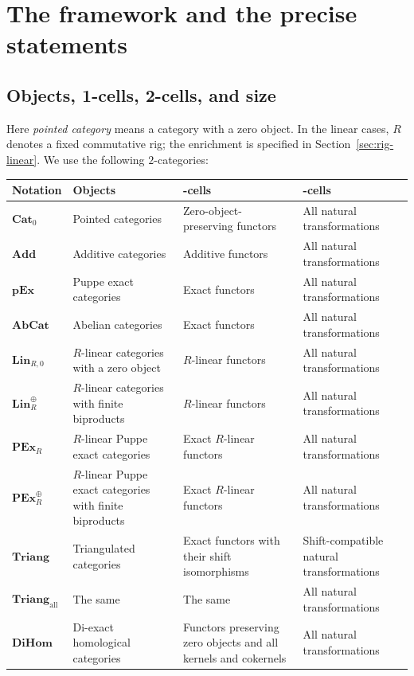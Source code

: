 \documentclass[11pt,reqno,a4paper]{amsart}
\theoremstyle{definition}
\theoremstyle{remark}
\newcommand{\0}{\mathbf{0}}
\renewcommand{\1}{\mathbf{1}}
\newcommand{\Triang}{\mathbf{Triang}}
\newcommand{\AbCat}{\mathbf{AbCat}}
\newcommand{\pExact}{\mathbf{pEx}}
\newcommand{\Pt}{\mathbf{Cat}_{0}}
\newcommand{\Add}{\mathbf{Add}}
\newcommand{\Tri}{\Triang}
\newcommand{\TriAll}{\mathbf{Triang}_{\mathrm{all}}}
\newcommand{\DiHom}{\mathbf{DiHom}}
\begin{document}
\setcounter{tocdepth}{1}
\tableofcontents

\section{The framework and the precise statements}\label{sec:framework}\label{sectionkernelscokernels}

\subsection{Objects, 1-cells, 2-cells, and size}

Here \emph{pointed category} means a category with a zero object. In the
linear cases, $R$ denotes a fixed commutative rig; the enrichment is
specified in Section~\ref{sec:rig-linear}. We use the following
$2$-categories:
\begin{center}
\small
\begin{tabularx}{\textwidth}{@{}l>{\raggedright\arraybackslash}X>{\raggedright\arraybackslash}X>{\raggedright\arraybackslash}X@{}}
\toprule
Notation & Objects & 1-cells & 2-cells\\
\midrule
$\Pt$ & Pointed categories & Zero-object-preserving functors & All natural transformations\\[3pt]
$\Add$ & Additive categories & Additive functors & All natural transformations\\[3pt]
$\pExact$ & Puppe exact categories & Exact functors & All natural transformations\\[3pt]
$\AbCat$ & Abelian categories & Exact functors & All natural transformations\\[3pt]
$\mathbf{Lin}_{R,0}$ & $R$-linear categories with a zero object & $R$-linear functors & All natural transformations\\[3pt]
$\mathbf{Lin}_{R}^{\oplus}$ & $R$-linear categories with finite biproducts & $R$-linear functors & All natural transformations\\[3pt]
$\mathbf{PEx}_{R}$ & $R$-linear Puppe exact categories & Exact $R$-linear functors & All natural transformations\\[3pt]
$\mathbf{PEx}_{R}^{\oplus}$ & $R$-linear Puppe exact categories with finite biproducts & Exact $R$-linear functors & All natural transformations\\[3pt]
$\Tri$ & Triangulated categories & Exact functors with their shift isomorphisms & Shift-compatible natural transformations\\[3pt]
$\TriAll$ & The same & The same & All natural transformations\\[3pt]
$\DiHom$ & Di-exact homological categories & Functors preserving zero objects and all kernels and cokernels & All natural transformations\\
\bottomrule
\end{tabularx}
\end{center}
\end{document}
